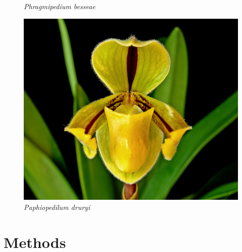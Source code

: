 \documentclass[]{beamer}
\begin{document}
\begin{frame}
\begin{figure}[!htb]
              \caption*{\textit{Phragmipedium besseae}}
            \endminipage\hfill
              \includegraphics[width=\linewidth]{Paphiopedilum_druryi}
              \caption*{\textit{Paphiopedilum druryi}}
            \endminipage\hfill
        \end{figure}
    \end{frame}


\section{Methods}

\end{document}
